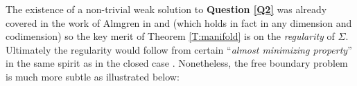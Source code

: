\documentclass[10pt]{amsart}
\newtheorem{theorem}{Theorem}[section]
\theoremstyle{definition}
\theoremstyle{remark}
\numberwithin{equation}{section}
\newcommand{\R}{\mathbb{R}}
\begin{document}




The existence of a non-trivial weak solution to \textbf{Question \ref{Q2}} was already covered in the work of Almgren in \cite{Almgren62} and \cite{Almgren65} (which holds in fact in any dimension and codimension) so the key merit of Theorem \ref{T:manifold} is on the \emph{regularity} of $\Sigma$. Ultimately the regularity would follow from certain ``\emph{almost minimizing property}'' in the same spirit as in the closed case \cite{Pitts}. Nonetheless, the free boundary problem is much more subtle as illustrated below:
\end{document}
